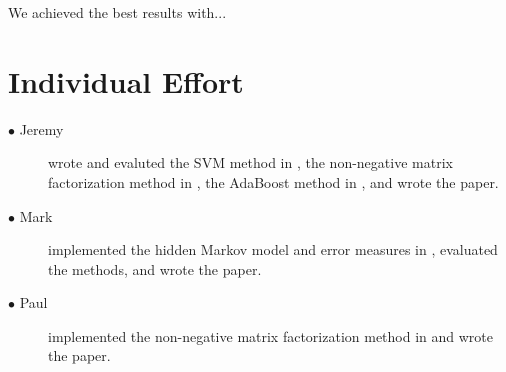 \documentclass[5p]{elsarticle}
\begin{document}
We achieved the best results with...







\section{Individual Effort}
\begin{description}
\item[$\bullet$ Jeremy] wrote and evaluted the SVM method in \citet{poliner2006discriminative}, the non-negative matrix factorization method in \citet{abdallah2004polyphonic}, the AdaBoost method in \citet{boogaart2009note}, and wrote the paper.
\item[$\bullet$ Mark] implemented the hidden Markov model and error measures in \citet{poliner2006discriminative}, evaluated the methods, and wrote the paper.
\item[$\bullet$ Paul] implemented the non-negative matrix factorization method in \citet{abdallah2004polyphonic} and wrote the paper.
\end{description}
\end{document}
